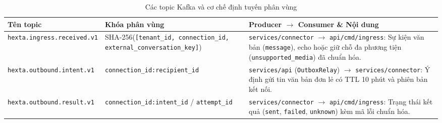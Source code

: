 \begin{table}[htbp]
  \centering
  \footnotesize
  \setlength{\tabcolsep}{4pt}
  \renewcommand{\arraystretch}{1.18}
  \caption{Các topic Kafka và cơ chế định tuyến phân vùng}\label{tab:kafka-topics}
  \begin{tabularx}{\linewidth}{@{}
    >{\raggedright\arraybackslash}p{4.5cm}
    >{\raggedright\arraybackslash}p{4.3cm}
    >{\raggedright\arraybackslash}X@{}}
    \toprule
    Tên topic & Khóa phân vùng & Producer $\rightarrow$ Consumer \& Nội dung \\
    \midrule
    \texttt{hexta.\hspace{0pt}ingress.\hspace{0pt}received.\hspace{0pt}v1} & SHA-256(\texttt{[tenant\_\hspace{0pt}id, connection\_\hspace{0pt}id, external\_\hspace{0pt}conversation\_\hspace{0pt}key]}) & \texttt{services/\hspace{0pt}connector} $\rightarrow$ \texttt{api/\hspace{0pt}cmd/\hspace{0pt}ingress}: Sự kiện văn bản (\texttt{message}), echo hoặc giữ chỗ đa phương tiện (\texttt{unsupported\_\hspace{0pt}media}) đã chuẩn hóa. \\
    \texttt{hexta.\hspace{0pt}outbound.\hspace{0pt}intent.\hspace{0pt}v1} & \texttt{connection\_\hspace{0pt}id:\hspace{0pt}recipient\_\hspace{0pt}id} & \texttt{services/\hspace{0pt}api} (\texttt{OutboxRelay}) $\rightarrow$ \texttt{services/\hspace{0pt}connector}: Ý định gửi tin văn bản đơn lẻ có TTL 10 phút và phiên bản kết nối. \\
    \texttt{hexta.\hspace{0pt}outbound.\hspace{0pt}result.\hspace{0pt}v1} & \texttt{connection\_\hspace{0pt}id:\hspace{0pt}intent\_\hspace{0pt}id} / \texttt{attempt\_\hspace{0pt}id} & \texttt{services/\hspace{0pt}connector} $\rightarrow$ \texttt{api/\hspace{0pt}cmd/\hspace{0pt}ingress}: Trạng thái kết quả (\texttt{sent}, \texttt{failed}, \texttt{unknown}) kèm mã lỗi chuẩn hóa. \\

\end{tabularx}
\end{table}
